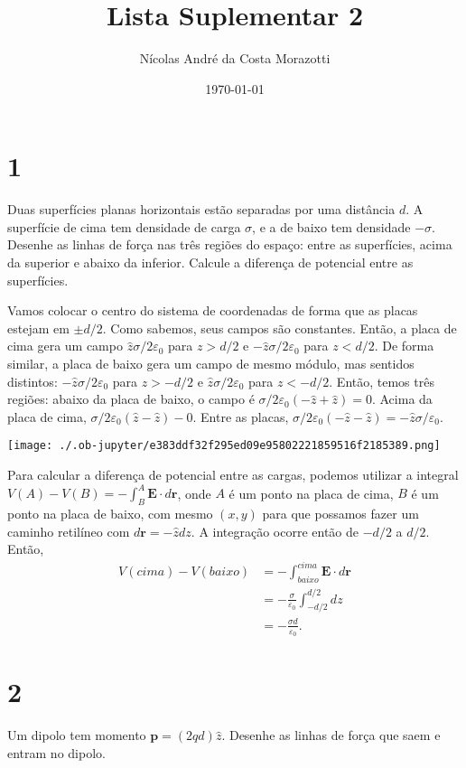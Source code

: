 \documentclass[11pt]{article}
\author{Nícolas André da Costa Morazotti}
\date{\today}
\title{Lista Suplementar 2}
\begin{document}
\maketitle
\section{1}
\label{sec:org81f442a}
Duas superfícies planas horizontais estão separadas por uma distância
\(d\). A superfície de cima tem densidade de carga \(\sigma\), e a de baixo tem
densidade \(-\sigma\). Desenhe as linhas de força nas três regiões do
espaço: entre as superfícies, acima da superior e abaixo da
inferior. Calcule a diferença de potencial entre as superfícies.

Vamos colocar o centro do sistema de coordenadas de forma que as placas
estejam em \(\pm d/2\). Como sabemos, seus campos são constantes. Então, a
placa de cima gera um campo \(\hat z\sigma/2\varepsilon_0\) para \(z>d/2\) e \(-\hat z\sigma/2\varepsilon_0\)
para \(z<d/2\). De forma similar, a placa de baixo gera um campo de mesmo
módulo, mas sentidos distintos: \(-\hat z\sigma/2\varepsilon_0\) para \(z>-d/2\) e \(\hat
z\sigma/2\varepsilon_0\) para \(z<-d/2\). Então, temos três regiões: abaixo da placa de
baixo, o campo é \(\sigma/2\varepsilon_0(-\hat z + \hat z)= 0\). Acima da placa de cima,
\(\sigma/2\varepsilon_0(\hat z - \hat z) - 0\). Entre as placas, \(\sigma/2\varepsilon_0 (-\hat z -\hat
z) = -\hat z\sigma/\varepsilon_0\). 

\begin{center}
\texttt{[image: ./.ob-jupyter/e383ddf32f295ed09e95802221859516f2185389.png]}
\end{center}

Para calcular a diferença de potencial entre as cargas, podemos utilizar
a integral \(V(A)-V(B)=-\int_B^A \mathbf E\cdot d\mathbf r\), onde \(A\) é um ponto
na placa de cima, \(B\) é um ponto na placa de baixo, com mesmo \((x,y)\)
para que possamos fazer um caminho retilíneo com \(d\mathbf r = -\hat
zdz\). A integração ocorre então de \(-d/2\) a \(d/2\). Então,
\begin{align*}
  V(cima) - V(baixo)
  &= -\int_{baixo}^{cima} \mathbf E\cdot d\mathbf{r}\\
  &= -\frac{\sigma}{\varepsilon_0}\int_{-d/2}^{d/2}dz\\
  &= -\frac{\sigma d}{\varepsilon_0}.
\end{align*}

\section{2}
\label{sec:orgdf3add6}
Um dipolo tem momento \(\mathbf p = (2qd)\hat z\). Desenhe as linhas de
força que saem e entram no dipolo. 
\end{document}
